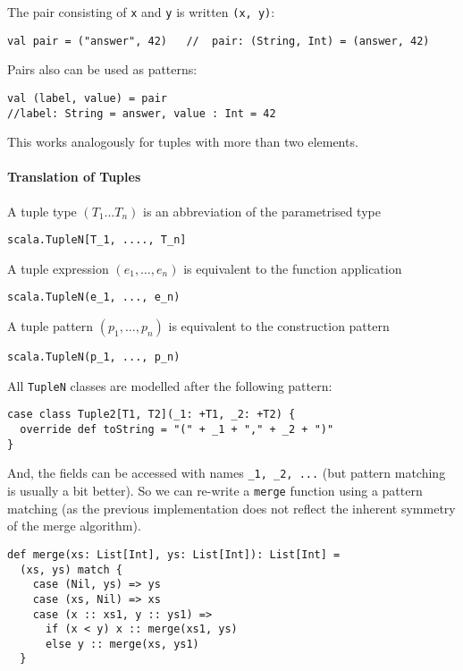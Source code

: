 \documentclass{scrartcl}
\begin{document}
The pair consisting of \lstinline|x| and \lstinline|y| is written
\lstinline|(x, y)|:
\begin{lstlisting}
val pair = ("answer", 42)   //  pair: (String, Int) = (answer, 42)
\end{lstlisting}

Pairs also can be used as patterns:
\begin{lstlisting}
val (label, value) = pair
//label: String = answer, value : Int = 42
\end{lstlisting}

This works analogously for tuples with more than two elements.

\paragraph{Translation of Tuples}

A tuple type $(T_1 \dots T_n)$ is an abbreviation of the parametrised type
\begin{lstlisting}
scala.TupleN[T_1, ...., T_n]
\end{lstlisting}

A tuple expression $(e_1, \dots, e_n)$ is equivalent to the function application
\begin{lstlisting}
scala.TupleN(e_1, ..., e_n)
\end{lstlisting}
A tuple pattern $(p_1, \dots,p_n)$ is equivalent to the construction pattern
\begin{lstlisting}
scala.TupleN(p_1, ..., p_n)
\end{lstlisting}

All \lstinline|TupleN| classes are modelled after the following pattern:
\begin{lstlisting}
case class Tuple2[T1, T2](_1: +T1, _2: +T2) {
  override def toString = "(" + _1 + "," + _2 + ")"
}
\end{lstlisting}
And, the fields can be accessed with names \lstinline|_1, _2, ...| (but pattern
matching is usually a bit better). So we can re-write a \lstinline|merge|
function using a pattern matching (as the previous implementation does not
reflect the inherent symmetry of the merge algorithm).
\begin{lstlisting}
def merge(xs: List[Int], ys: List[Int]): List[Int] =
  (xs, ys) match {
    case (Nil, ys) => ys
    case (xs, Nil) => xs
    case (x :: xs1, y :: ys1) =>
      if (x < y) x :: merge(xs1, ys)
      else y :: merge(xs, ys1)
  }
\end{lstlisting}
\end{document}
